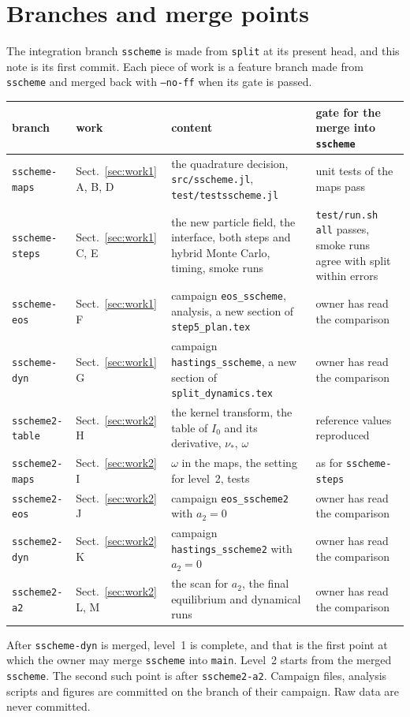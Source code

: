 \documentclass[11pt,aps,preprint,nofootinbib,superscriptaddress,tightenlines]{revtex4-2}
\def\Sect#1{Sect.~\ref{#1}}
\begin{document}
\section{Branches and merge points}
\label{sec:branches}

The integration branch \texttt{sscheme} is made from \texttt{split} at its present head, and this note is its first commit.  Each piece of work is a
feature branch made from \texttt{sscheme} and merged back with \texttt{--no-ff} when its gate is passed.
\begin{center}
\small
\begin{tabular}{llp{}p{}}
\toprule
branch & work & content & gate for the merge into \texttt{sscheme} \\
\midrule
\texttt{sscheme-maps} & \Sect{sec:work1} A, B, D & the quadrature decision, \nolinkurl{src/sscheme.jl}, \nolinkurl{test/testsscheme.jl} &
  unit tests of the maps pass \\
\texttt{sscheme-steps} & \Sect{sec:work1} C, E & the new particle field, the interface, both steps and hybrid Monte Carlo, timing, smoke runs &
  \texttt{test/run.sh all} passes, smoke runs agree with split within errors \\
\texttt{sscheme-eos} & \Sect{sec:work1} F & campaign \texttt{eos\_sscheme}, analysis, a new section of \nolinkurl{step5_plan.tex} &
  owner has read the comparison \\
\texttt{sscheme-dyn} & \Sect{sec:work1} G & campaign \texttt{hastings\_sscheme}, a new section of \nolinkurl{split_dynamics.tex} &
  owner has read the comparison \\
\midrule
\texttt{sscheme2-table} & \Sect{sec:work2} H & the kernel transform, the table of $I_0$ and its derivative, $\nu_*$, $\omega$ &
  reference values reproduced \\
\texttt{sscheme2-maps} & \Sect{sec:work2} I & $\omega$ in the maps, the setting for level~2, tests & as for \texttt{sscheme-steps} \\
\texttt{sscheme2-eos} & \Sect{sec:work2} J & campaign \texttt{eos\_sscheme2} with $a_2=0$ & owner has read the comparison \\
\texttt{sscheme2-dyn} & \Sect{sec:work2} K & campaign \texttt{hastings\_sscheme2} with $a_2=0$ & owner has read the comparison \\
\texttt{sscheme2-a2} & \Sect{sec:work2} L, M & the scan for $a_2$, the final equilibrium and dynamical runs & owner has read the comparison \\
\bottomrule
\end{tabular}
\end{center}
After \texttt{sscheme-dyn} is merged, level~1 is complete, and that is the first point at which the owner may merge \texttt{sscheme} into \texttt{main}.
Level~2 starts from the merged \texttt{sscheme}.  The second such point is after \texttt{sscheme2-a2}.  Campaign files, analysis scripts and figures are
committed on the branch of their campaign.  Raw data are never committed.
\end{document}
